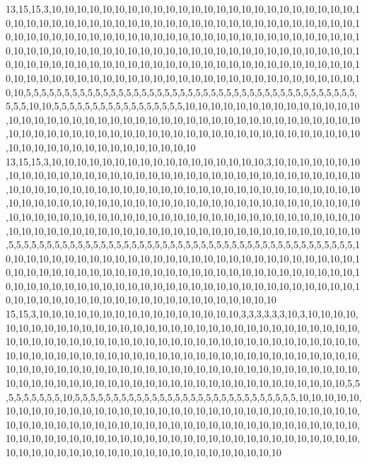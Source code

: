 13,15,15,3,10,10,10,10,10,10,10,10,10,10,10,10,10,10,10,10,10,10,10,10,10,10,10,10,10,10,10,10,10,10,10,10,10,10,10,10,10,10,10,10,10,10,10,10,10,10,10,10,10,10,10,10,10,10,10,10,10,10,10,10,10,10,10,10,10,10,10,10,10,10,10,10,10,10,10,10,10,10,10,10,10,10,10,10,10,10,10,10,10,10,10,10,10,10,10,10,10,10,10,10,10,10,10,10,10,10,10,10,10,10,10,10,10,10,10,10,10,10,10,10,10,10,10,10,10,10,10,10,10,10,10,10,10,10,10,10,10,10,10,10,10,10,10,10,10,10,10,10,10,10,10,10,10,10,10,10,10,10,10,10,10,10,10,10,10,10,5,5,5,5,5,5,5,5,5,5,5,5,5,5,5,5,5,5,5,5,5,5,5,5,5,5,5,5,5,5,5,5,5,5,5,5,5,5,5,5,5,5,5,5,5,5,10,10,5,5,5,5,5,5,5,5,5,5,5,5,5,5,5,5,5,10,10,10,10,10,10,10,10,10,10,10,10,10,10,10,10,10,10,10,10,10,10,10,10,10,10,10,10,10,10,10,10,10,10,10,10,10,10,10,10,10,10,10,10,10,10,10,10,10,10,10,10,10,10,10,10,10,10,10,10,10,10,10,10,10,10,10,10,10,10,10,10,10,10,10,10,10,10,10,10,10,10,10,10,10
13,15,15,3,10,10,10,10,10,10,10,10,10,10,10,10,10,10,10,10,10,3,10,10,10,10,10,10,10,10,10,10,10,10,10,10,10,10,10,10,10,10,10,10,10,10,10,10,10,10,10,10,10,10,10,10,10,10,10,10,10,10,10,10,10,10,10,10,10,10,10,10,10,10,10,10,10,10,10,10,10,10,10,10,10,10,10,10,10,10,10,10,10,10,10,10,10,10,10,10,10,10,10,10,10,10,10,10,10,10,10,10,10,10,10,10,10,10,10,10,10,10,10,10,10,10,10,10,10,10,10,10,10,10,10,10,10,10,10,10,10,10,10,10,10,10,10,10,10,10,10,10,10,10,10,10,10,10,10,10,10,10,10,10,10,10,10,10,10,5,5,5,5,5,5,5,5,5,5,5,5,5,5,5,5,5,5,5,5,5,5,5,5,5,5,5,5,5,5,5,5,5,5,5,5,5,5,5,5,5,5,5,5,5,10,10,10,10,10,10,10,10,10,10,10,10,10,10,10,10,10,10,10,10,10,10,10,10,10,10,10,10,10,10,10,10,10,10,10,10,10,10,10,10,10,10,10,10,10,10,10,10,10,10,10,10,10,10,10,10,10,10,10,10,10,10,10,10,10,10,10,10,10,10,10,10,10,10,10,10,10,10,10,10,10,10,10,10,10,10,10,10,10,10,10,10,10,10,10,10,10,10,10,10,10,10,10,10,10,10
15,15,3,10,10,10,10,10,10,10,10,10,10,10,10,10,10,10,10,3,3,3,3,3,3,10,3,10,10,10,10,10,10,10,10,10,10,10,10,10,10,10,10,10,10,10,10,10,10,10,10,10,10,10,10,10,10,10,10,10,10,10,10,10,10,10,10,10,10,10,10,10,10,10,10,10,10,10,10,10,10,10,10,10,10,10,10,10,10,10,10,10,10,10,10,10,10,10,10,10,10,10,10,10,10,10,10,10,10,10,10,10,10,10,10,10,10,10,10,10,10,10,10,10,10,10,10,10,10,10,10,10,10,10,10,10,10,10,10,10,10,10,10,10,10,10,10,10,10,10,10,10,10,10,10,10,10,10,10,10,10,10,10,10,10,10,10,10,10,10,5,5,5,5,5,5,5,5,5,10,5,5,5,5,5,5,5,5,5,5,5,5,5,5,5,5,5,5,5,5,5,5,5,5,5,5,5,5,5,10,10,10,10,10,10,10,10,10,10,10,10,10,10,10,10,10,10,10,10,10,10,10,10,10,10,10,10,10,10,10,10,10,10,10,10,10,10,10,10,10,10,10,10,10,10,10,10,10,10,10,10,10,10,10,10,10,10,10,10,10,10,10,10,10,10,10,10,10,10,10,10,10,10,10,10,10,10,10,10,10,10,10,10,10,10,10,10,10,10,10,10,10,10,10,10,10,10,10,10,10,10,10,10,10,10,10,10,10,10,10
